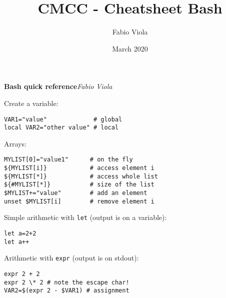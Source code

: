 \documentclass[twocolumn,8pt]{article}
\title{CMCC - Cheatsheet Bash}
\author{Fabio Viola}
\date{March 2020}
\begin{document}

\LARGE \textbf{Bash quick reference}\hfill \textit{\small Fabio Viola}\normalsize 



\begin{mdframed}[frametitle=Variables]
Create a variable:
\begin{lstlisting}
VAR1="value"             # global
local VAR2="other value" # local
\end{lstlisting}
Arrays:
\begin{lstlisting}
MYLIST[0]="value1"      # on the fly
${MYLIST[i]}            # access element i
${MYLIST[*]}            # access whole list
${#MYLIST[*]}           # size of the list
$MYLIST+="value"        # add an element
unset $MYLIST[i]        # remove element i
\end{lstlisting}
\end{mdframed}


\begin{mdframed}[frametitle=Arithmetic]
Simple arithmetic with \texttt{let} (output is on a variable):
\begin{lstlisting}
let a=2+2
let a++
\end{lstlisting}

Arithmetic with \texttt{expr} (output is on stdout):
\begin{lstlisting}
expr 2 + 2
expr 2 \* 2 # note the escape char!
VAR2=$(expr 2 - $VAR1) # assignment
\end{lstlisting}
\end{mdframed}

\end{document}
